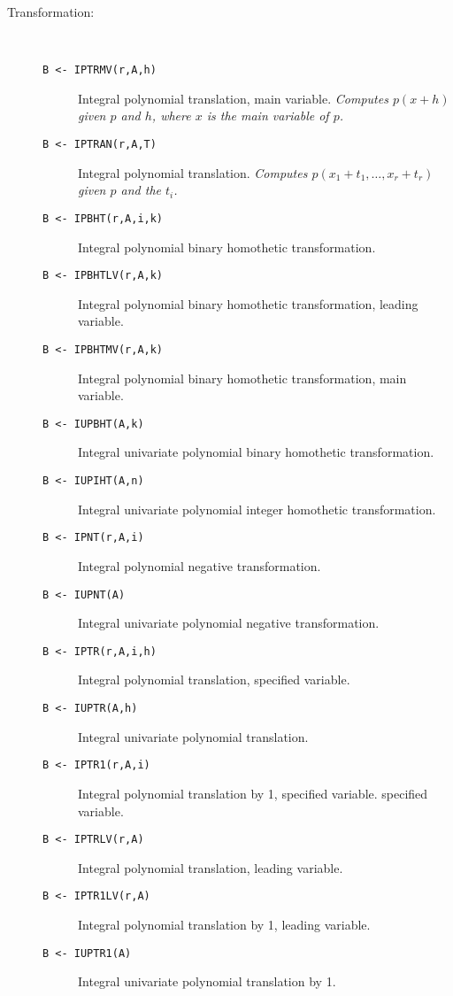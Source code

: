\begin{description}
\item[Transformation:] \ \
  \begin{description}
  \item[{\tt B <- IPTRMV(r,A,h) 
}]  Integral polynomial translation, main variable. {\em
    Computes $p(x+h)$ given $p$ and $h$, where $x$ is the main variable of
    $p$.}
  \item[{\tt B <- IPTRAN(r,A,T) 
}]  Integral polynomial translation. {\em Computes
    $p(x_1+t_1,\ldots,x_r+t_r)$ given $p$ and the $t_i$.}
  \item[{\tt B <- IPBHT(r,A,i,k) 
}]  Integral polynomial binary homothetic transformation.
  \item[{\tt B <- IPBHTLV(r,A,k) 
}]  Integral polynomial binary homothetic transformation,
    leading variable.
  \item[{\tt B <- IPBHTMV(r,A,k) 
}]  Integral polynomial binary homothetic transformation,
    main variable.
  \item[{\tt B <- IUPBHT(A,k) 
}]  Integral univariate polynomial binary homothetic
    transformation.
  \item[{\tt B <- IUPIHT(A,n) 
}]  Integral univariate polynomial integer homothetic
    transformation.
  \item[{\tt B <- IPNT(r,A,i) 
}]  Integral polynomial negative transformation.
  \item[{\tt B <- IUPNT(A) 
}]  Integral univariate polynomial negative transformation.
  \item[{\tt B <- IPTR(r,A,i,h) 
}]  Integral polynomial translation, specified variable.
  \item[{\tt B <- IUPTR(A,h) 
}]  Integral univariate polynomial translation.
  \item[{\tt B <- IPTR1(r,A,i) 
}]  Integral polynomial translation by 1, specified variable.
    specified variable.
  \item[{\tt B <- IPTRLV(r,A) 
}]  Integral polynomial translation, leading variable.
  \item[{\tt B <- IPTR1LV(r,A) 
}]  Integral polynomial translation by 1, leading variable.
  \item[{\tt B <- IUPTR1(A) 
}]  Integral univariate polynomial translation by 1.

  \end{description}


\end{description}
